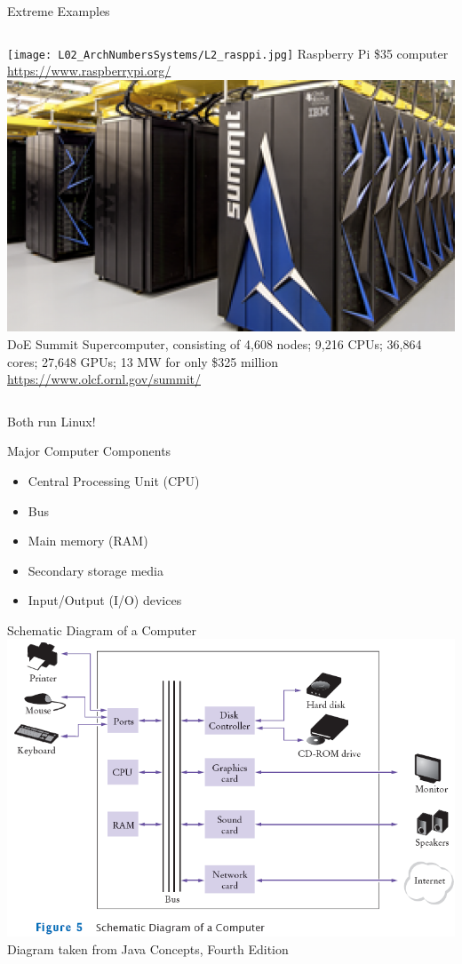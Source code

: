\documentclass[graphics]{beamer}
\begin{document}
\begin{frame}{Extreme Examples}
    \begin{columns}
            \texttt{[image: L02\_ArchNumbersSystems/L2\_rasppi.jpg]}
            Raspberry Pi \$35 computer
            \footnotesize
            \url{https://www.raspberrypi.org/}
            \includegraphics[scale=0.4]{L02_ArchNumbersSystems/L2_summit.png}
            DoE Summit Supercomputer, consisting of 4,608 nodes; 9,216 CPUs; 36,864 cores; 27,648 GPUs; 13 MW for only \$325 million
            \footnotesize
            \url{https://www.olcf.ornl.gov/summit/}
    \end{columns}
    \footnotesize Both run Linux!
\end{frame}

\begin{frame}{Major Computer Components}
    \begin{itemize}
        \item Central Processing Unit (CPU)
        \item Bus
        \item Main memory (RAM)
        \item Secondary storage media
        \item Input/Output (I/O) devices
    \end{itemize}
\end{frame}

\begin{frame}{Schematic Diagram of a Computer}
    \centering
    \includegraphics[scale=0.6]{L02_ArchNumbersSystems/L2_p7.png}
    \footnotesize{Diagram taken from Java Concepts, Fourth Edition}
\end{frame}
\end{document}
